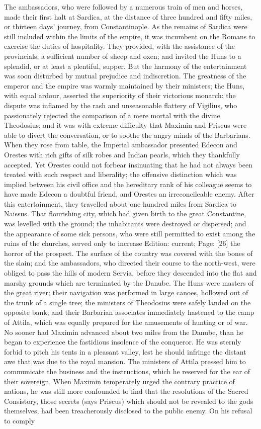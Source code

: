 The ambassadors, who were followed by a numerous train of men and horses, made their first halt at Sardica, at the distance of three hundred and fifty miles, or thirteen days\texthebrew{}’ journey, from Constantinople. As the remains of Sardica were still included within the limits of the empire, it was incumbent on the Romans to exercise the duties of hospitality. They provided, with the assistance of the provincials, a sufficient number of sheep and oxen; and invited the Huns to a splendid, or at least a plentiful, supper. But the harmony of the entertainment was soon disturbed by mutual prejudice and indiscretion. The greatness of the emperor and the empire was warmly maintained by their ministers; the Huns, with equal ardour, asserted the superiority of their victorious monarch: the dispute was inflamed by the rash and unseasonable flattery of Vigilius, who passionately rejected the comparison of a mere mortal with the divine Theodosius; and it was with extreme difficulty that Maximin and Priscus were able to divert the conversation, or to soothe the angry minds of the Barbarians. When they rose from table, the Imperial ambassador presented Edecon and Orestes with rich gifts of silk robes and Indian pearls, which they thankfully accepted. Yet Orestes could not forbear insinuating that he had not always been treated with such respect and liberality; the offensive distinction which was implied between his civil office and the hereditary rank of his colleague seems to have made Edecon a doubtful friend, and Orestes an irreconcileable enemy. After this entertainment, they travelled about one hundred miles from Sardica to Naissus. That flourishing city, which had given birth to the great Constantine, was levelled with the ground; the inhabitants were destroyed or dispersed; and the appearance of some sick persons, who were still permitted to exist among the ruins of the churches, served only to increase Edition: current; Page: [26] the horror of the prospect. The surface of the country was covered with the bones of the slain; and the ambassadors, who directed their course to the north-west, were obliged to pass the hills of modern Servia, before they descended into the flat and marshy grounds which are terminated by the Danube. The Huns were masters of the great river; their navigation was performed in large canoes, hollowed out of the trunk of a single tree; the ministers of Theodosius were safely landed on the opposite bank; and their Barbarian associates immediately hastened to the camp of Attila, which was equally prepared for the amusements of hunting or of war. No sooner had Maximin advanced about two miles from the Danube, than he began to experience the fastidious insolence of the conqueror. He was sternly forbid to pitch his tents in a pleasant valley, lest he should infringe the distant awe that was due to the royal mansion. The ministers of Attila pressed him to communicate the business and the instructions, which he reserved for the ear of their sovereign. When Maximin temperately urged the contrary practice of nations, he was still more confounded to find that the resolutions of the Sacred Consistory, those secrets (says Priscus) which should not be revealed to the gods themselves, had been treacherously disclosed to the public enemy. On his refusal to comply 